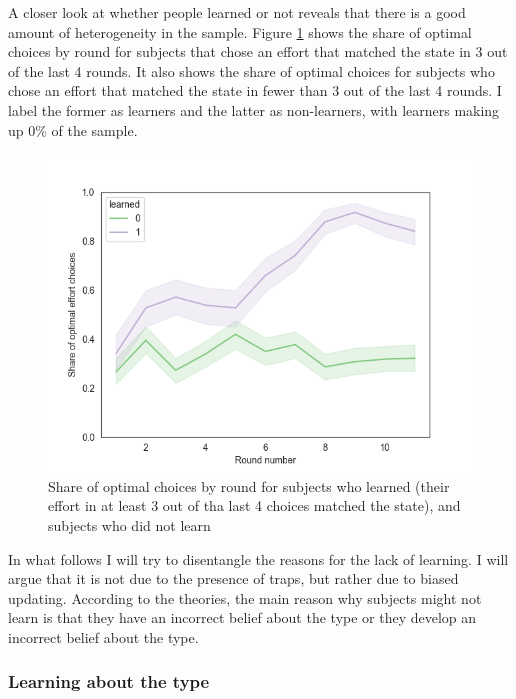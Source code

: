 \documentclass[
  12pt,
]{article}
\begin{document}
A closer look at whether people learned or not reveals that there is a
good amount of heterogeneity in the sample. Figure
\ref{fig:learning-by-groups} shows the share of optimal choices by round
for subjects that chose an effort that matched the state in 3 out of the
last 4 rounds. It also shows the share of optimal choices for subjects
who chose an effort that matched the state in fewer than 3 out of the
last 4 rounds. I label the former as learners and the latter as
non-learners, with learners making up 0\% of the sample.

\begin{figure}
\hypertarget{fig:learning-by-groups}{%
\centering
\includegraphics{../figures/learning_groups.png}
\caption{Share of optimal choices by round for subjects who learned
(their effort in at least 3 out of tha last 4 choices matched the
state), and subjects who did not learn}\label{fig:learning-by-groups}
}
\end{figure}

In what follows I will try to disentangle the reasons for the lack of
learning. I will argue that it is not due to the presence of traps, but
rather due to biased updating. According to the theories, the main
reason why subjects might not learn is that they have an incorrect
belief about the type or they develop an incorrect belief about the
type.

\hypertarget{learning-about-the-type}{%
\subsubsection{Learning about the type}\label{learning-about-the-type}}
\end{document}
